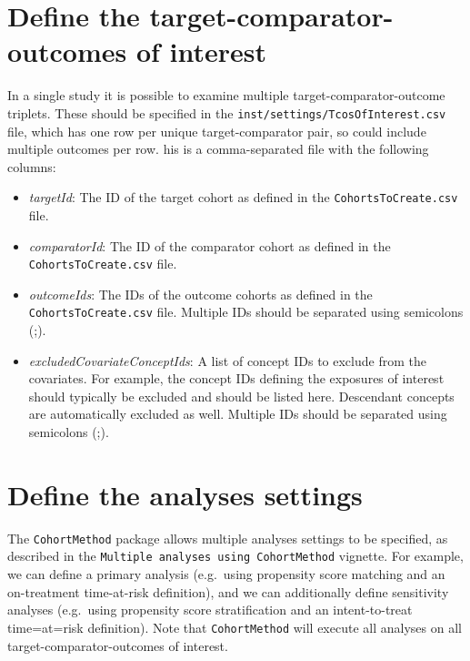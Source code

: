 \documentclass[
]{article}
\providecommand{\tightlist}{%
  \setlength{\itemsep}{0pt}\setlength{\parskip}{0pt}}
\begin{document}
\hypertarget{define-the-target-comparator-outcomes-of-interest}{%
\section{Define the target-comparator-outcomes of
interest}\label{define-the-target-comparator-outcomes-of-interest}}

In a single study it is possible to examine multiple
target-comparator-outcome triplets. These should be specified in the
\texttt{inst/settings/TcosOfInterest.csv} file, which has one row per
unique target-comparator pair, so could include multiple outcomes per
row. his is a comma-separated file with the following columns:

\begin{itemize}
\tightlist
\item
  \emph{targetId}: The ID of the target cohort as defined in the
  \texttt{CohortsToCreate.csv} file.
\item
  \emph{comparatorId}: The ID of the comparator cohort as defined in the
  \texttt{CohortsToCreate.csv} file.
\item
  \emph{outcomeIds}: The IDs of the outcome cohorts as defined in the
  \texttt{CohortsToCreate.csv} file. Multiple IDs should be separated
  using semicolons (;).
\item
  \emph{excludedCovariateConceptIds}: A list of concept IDs to exclude
  from the covariates. For example, the concept IDs defining the
  exposures of interest should typically be excluded and should be
  listed here. Descendant concepts are automatically excluded as well.
  Multiple IDs should be separated using semicolons (;).
\end{itemize}

\hypertarget{define-the-analyses-settings}{%
\section{Define the analyses
settings}\label{define-the-analyses-settings}}

The \texttt{CohortMethod} package allows multiple analyses settings to
be specified, as described in the
\texttt{Multiple\ analyses\ using\ CohortMethod} vignette. For example,
we can define a primary analysis (e.g.~using propensity score matching
and an on-treatment time-at-risk definition), and we can additionally
define sensitivity analyses (e.g.~using propensity score stratification
and an intent-to-treat time=at=risk definition). Note that
\texttt{CohortMethod} will execute all analyses on all
target-comparator-outcomes of interest.
\end{document}
